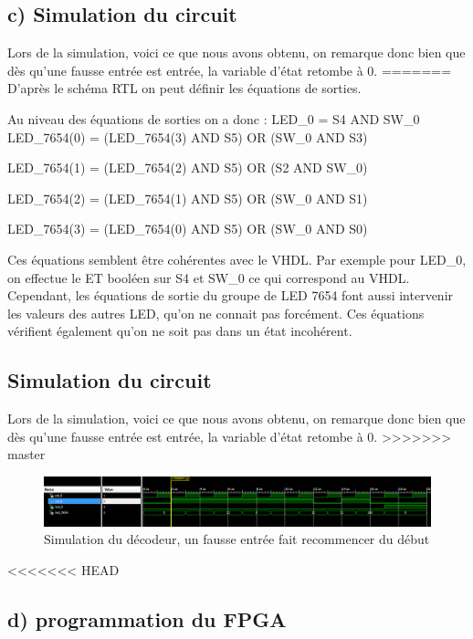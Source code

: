 \documentclass[11pt]{report}
\begin{document}
  \subsection{ c) Simulation du circuit}

Lors de la simulation, voici ce que nous avons obtenu, on remarque donc bien que dès qu'une fausse entrée est entrée, la variable d'état retombe à 0.
=======
D'après le schéma RTL on peut définir les équations de sorties. 
  
 Au niveau des équations de sorties on a donc : \medbreak
 LED\_0 = S4 AND SW\_0 \medbreak 
 LED\_7654(0) = (LED\_7654(3) AND S5) OR (SW\_0 AND S3)\medbreak
 
 LED\_7654(1) = (LED\_7654(2) AND S5) OR (S2 AND SW\_0) \medbreak
 
 LED\_7654(2) = (LED\_7654(1) AND S5) OR (SW\_0 AND S1) \medbreak
 
 LED\_7654(3) = (LED\_7654(0) AND S5) OR (SW\_0 AND S0) \medbreak
 
 
 Ces équations semblent être cohérentes avec le VHDL. Par exemple pour LED\_0, on effectue le ET booléen sur S4 et SW\_0 ce qui correspond au VHDL.  Cependant, les équations de sortie du groupe de LED 7654 font aussi intervenir les valeurs des autres LED, qu'on ne connait pas forcément. Ces équations vérifient également qu'on ne soit pas dans un état incohérent.
  
 
  \subsection{ Simulation du circuit}
 
Lors de la simulation, voici ce que nous avons obtenu, on remarque donc bien que dès qu'une fausse entrée est entrée, la variable d'état retombe à 0. 
>>>>>>> master

\begin{figure}[!h]
\includegraphics[width=15cm]{TP02-7.PNG}
\caption{Simulation du décodeur, un fausse entrée fait recommencer du début}
\end{figure}
<<<<<<< HEAD


   \subsection{ d) programmation du FPGA}
\end{document}
